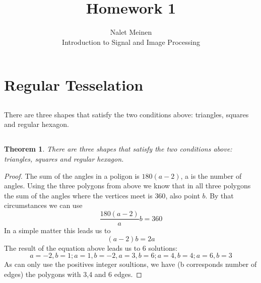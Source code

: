 \documentclass[12pt]{article}
\begin{document}


\title{Homework 1}%
\author{Nalet Meinen\\ %
Introduction to Signal and Image Processing
}

\maketitle

\section{Regular Tesselation}
\subsection{}
  There are three shapes that satisfy the two conditions above: triangles, squares and regular hexagon.
\subsection{}
\newtheorem{thm}{Theorem}
\begin{thm}
  There are three shapes that satisfy the two conditions above: triangles, squares and regular hexagon.
\end{thm}

\begin{proof}
The sum of the angles in a poligon is $180(a-2)$, a is the number of angles. 
Using the three polygons from above we know that in all three polygons the sum of the angles 
where the vertices meet is $360$, also point $b$. By that circumstances we can use
\[
\frac{180(a-2)}{a}b=360
\]
In a simple matter this leads us to
\[
(a-2)b=2a
\]
The result of the equation above leads us to 6 solutions: 
\[
  a=-2,b=1;a=1,b=-2,a=3,b=6;a=4,b=4;a=6,b=3
\]
As can only use the positives integer soultions, we have (b corresponds number of edges) the polygons
with 3,4 and 6 edges.
\end{proof}
\end{document}
